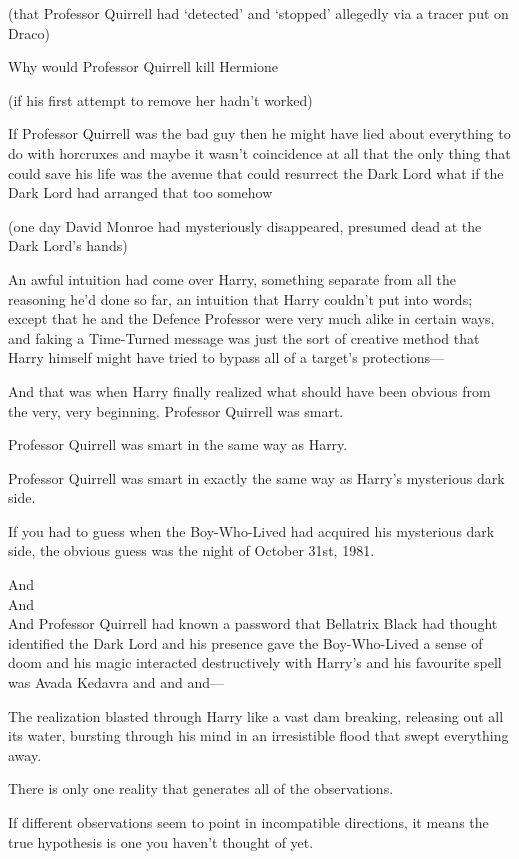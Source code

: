(that Professor Quirrell had ‘detected’ and ‘stopped’ allegedly via a tracer put on Draco)

Why would Professor Quirrell kill Hermione

(if his first attempt to remove her hadn’t worked)

If Professor Quirrell was the bad guy then he might have lied about everything to do with horcruxes and maybe it wasn’t coincidence at all that the only thing that could save his life was the avenue that could resurrect the Dark Lord what if the Dark Lord had arranged that too somehow

(one day David Monroe had mysteriously disappeared, presumed dead at the Dark Lord’s hands)

An awful intuition had come over Harry, something separate from all the reasoning he’d done so far, an intuition that Harry couldn’t put into words; except that he and the Defence Professor were very much alike in certain ways, and faking a Time-Turned message was just the sort of creative method that Harry himself might have tried to bypass all of a target’s protections—

And that was when Harry finally realized what should have been obvious from the very, very beginning. \later Professor Quirrell was smart.

Professor Quirrell was smart in the same way as Harry.

Professor Quirrell was smart in exactly the same way as Harry’s mysterious dark side.

If you had to guess when the Boy-Who-Lived had acquired his mysterious dark side, the obvious guess was the night of October 31st, 1981.

\later

\noindent And\\
And\\
And Professor Quirrell had known a password that Bellatrix Black had thought identified the Dark Lord and his presence gave the Boy-Who-Lived a sense of doom and his magic interacted destructively with Harry’s and his favourite spell was Avada Kedavra and and and—

The realization blasted through Harry like a vast dam breaking, releasing out all its water, bursting through his mind in an irresistible flood that swept everything away.

There is only one reality that generates all of the observations.

If different observations seem to point in incompatible directions, it means the true hypothesis is one you haven’t thought of yet.

